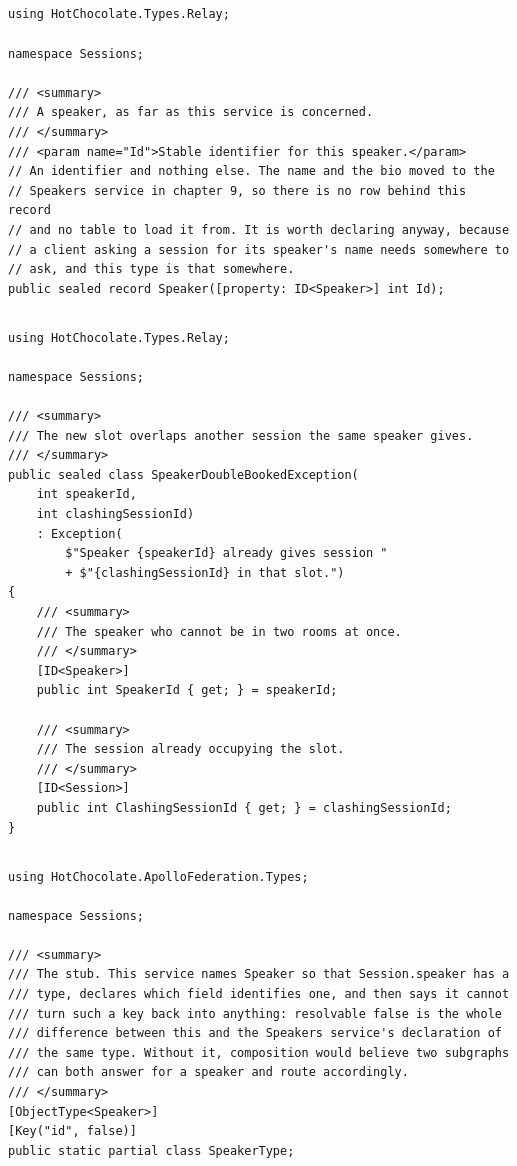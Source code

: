 \subsection*{}
\begin{verbatim}
using HotChocolate.Types.Relay;

namespace Sessions;

/// <summary>
/// A speaker, as far as this service is concerned.
/// </summary>
/// <param name="Id">Stable identifier for this speaker.</param>
// An identifier and nothing else. The name and the bio moved to the
// Speakers service in chapter 9, so there is no row behind this record
// and no table to load it from. It is worth declaring anyway, because
// a client asking a session for its speaker's name needs somewhere to
// ask, and this type is that somewhere.
public sealed record Speaker([property: ID<Speaker>] int Id);
\end{verbatim}

\subsection*{}
\begin{verbatim}
using HotChocolate.Types.Relay;

namespace Sessions;

/// <summary>
/// The new slot overlaps another session the same speaker gives.
/// </summary>
public sealed class SpeakerDoubleBookedException(
    int speakerId,
    int clashingSessionId)
    : Exception(
        $"Speaker {speakerId} already gives session "
        + $"{clashingSessionId} in that slot.")
{
    /// <summary>
    /// The speaker who cannot be in two rooms at once.
    /// </summary>
    [ID<Speaker>]
    public int SpeakerId { get; } = speakerId;

    /// <summary>
    /// The session already occupying the slot.
    /// </summary>
    [ID<Session>]
    public int ClashingSessionId { get; } = clashingSessionId;
}
\end{verbatim}

\subsection*{}
\begin{verbatim}
using HotChocolate.ApolloFederation.Types;

namespace Sessions;

/// <summary>
/// The stub. This service names Speaker so that Session.speaker has a
/// type, declares which field identifies one, and then says it cannot
/// turn such a key back into anything: resolvable false is the whole
/// difference between this and the Speakers service's declaration of
/// the same type. Without it, composition would believe two subgraphs
/// can both answer for a speaker and route accordingly.
/// </summary>
[ObjectType<Speaker>]
[Key("id", false)]
public static partial class SpeakerType;
\end{verbatim}

